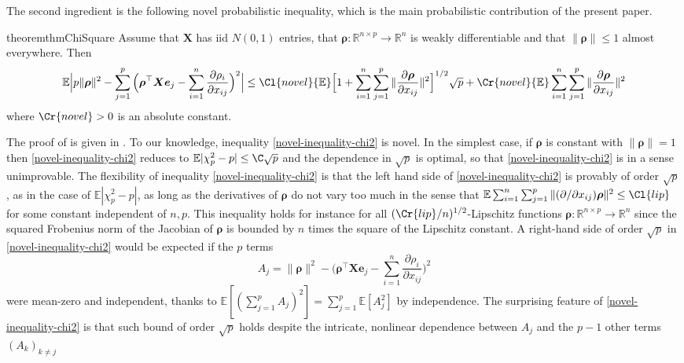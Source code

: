\documentclass[11pt]{amsart}
\numberwithin{equation}{section}
\numberwithin{equation}{section}
\def\real{{\mathbb{R}}}
\def\R{{\real}}
\def\E{{\mathbb{E}}}
\def\mathbold{\boldsymbol} %
\def\be{\mathbold{e}}
\def\bX{\mathbold{X}}\def\hbX{{\widehat{\bX}}}\def\tbX{{\widetilde{\bX}}}\def\bXbar{{\overline \bX}}
\def\brho{\mathbold{\rho}}\def\rhohat{\widehat{\rho}}\def\hrho{\widehat{\rho}}
\begin{document}
The second ingredient is the following novel probabilistic inequality,
which is the main probabilistic contribution of the present paper.
\begin{restatable*}{theorem}{thmChiSquare}
    \label{thm:chi-square-type-main-text-rho}
    Assume that $\bX$ has iid $N(0,1)$ entries,
    that $\brho:\R^{n\times p}\to\R^n$ is weakly differentiable
    and that $\|\brho\|\le 1$ almost everywhere.
    Then
    \begin{equation}
\label{novel-inequality-chi2}
\E\Big|
p \|\brho\|^2
-
\sum_{j=1}^p\Big(
    \brho^\top\bX\be_j -\sum_{i=1}^n \frac{\partial \rho_i}{\partial x_{ij}} \Big)^2
\Big|
\le \Cl{novel}
\E
\Bigl[
1+
\sum_{i=1}^n\sum_{j=1}^p \|
    \frac{\partial \brho}{\partial x_{ij}} 
    \|^2
\Bigr]^{1/2}
\sqrt p
+
\Cr{novel} \E\sum_{i=1}^n\sum_{j=1}^p \|\frac{\partial \brho }{\partial x_{ij}} \|^2
    \end{equation}
where $\Cr{novel}>0$ is an absolute constant.
\end{restatable*}
The proof of  is given in
.
To our knowledge, inequality \eqref{novel-inequality-chi2} is novel.
In the simplest case, if $\brho$ is constant with $\|\brho\|=1$ then
\eqref{novel-inequality-chi2} reduces to
$\E|\chi^2_p - p| \le \C \sqrt p$ and the dependence in $\sqrt p$ is optimal,
so that \eqref{novel-inequality-chi2} is in a sense unimprovable.
The flexibility of inequality \eqref{novel-inequality-chi2} is that
the left hand side of \eqref{novel-inequality-chi2} is provably of order
$\sqrt p$, as in the case of $\E|\chi^2_p-p|$, as long as
the derivatives of $\brho$ do not vary too much in the sense
that $\E\sum_{i=1}^n\sum_{j=1}^p \|(\partial/\partial x_{ij})\brho\|^2 \le \Cl{lip}$ for some constant independent of $n,p$.
This inequality holds for instance for all $(\Cr{lip}/n)^{1/2}$-Lipschitz
functions $\brho:\R^{n\times p}\to \R^n$ since the squared Frobenius
norm of the Jacobian of $\brho$ is bounded by $n$ times the square
of the Lipschitz constant. 
A right-hand side of order $\sqrt p$ in \eqref{novel-inequality-chi2}
would be expected if the $p$ terms
$$A_j = \|\brho\|^2 - \bigl(
    \brho^\top\bX\be_j -\sum_{i=1}^n \frac{\partial \rho_i}{\partial x_{ij}} \bigr)^2
$$
were mean-zero and independent, thanks to
$\E[(\sum_{j=1}^p A_j)^2]=\sum_{j=1}^p \E[A_j^2]$
by independence.
The surprising feature of \eqref{novel-inequality-chi2}
is that such bound of order $\sqrt p$ holds despite
the intricate, nonlinear dependence between $A_j$
and the $p-1$ other terms $(A_k)_{k\ne j}$
\end{document}
